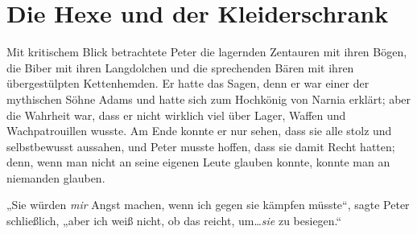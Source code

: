\section{Die Hexe und der Kleiderschrank}

Mit kritischem Blick betrachtete Peter die lagernden Zentauren mit ihren Bögen, die Biber mit ihren Langdolchen und die sprechenden Bären mit ihren übergestülpten Kettenhemden. Er hatte das Sagen, denn er war einer der mythischen Söhne Adams und hatte sich zum Hochkönig von Narnia erklärt; aber die Wahrheit war, dass er nicht wirklich viel über Lager, Waffen und Wachpatrouillen wusste. Am Ende konnte er nur sehen, dass sie alle stolz und selbstbewusst aussahen, und Peter musste hoffen, dass sie damit Recht hatten; denn, wenn man nicht an seine eigenen Leute glauben konnte, konnte man an niemanden glauben.

„Sie würden \emph{mir} Angst machen, wenn ich gegen sie kämpfen müsste“, sagte Peter schließlich, „aber ich weiß nicht, ob das reicht, um…\emph{sie} zu besiegen.“

